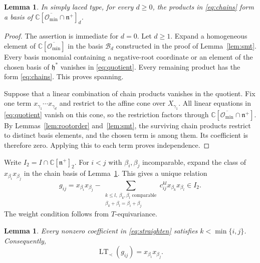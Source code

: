 \documentclass[12pt]{article}
\newtheorem{lemma}[theorem]{Lemma}
\theoremstyle{definition}
\DeclareMathOperator{\LT}{LT}
\newcommand{\C}{\mathbb C}
\newcommand{\h}{\mathfrak h}
\newcommand{\n}{\mathfrak n^{+}}
\newcommand{\oc}{\overline{\mathcal O_{\min}}}
\begin{document}
\begin{lemma}\label{lem:basis}
    In simply laced type, for every $d\geq0$, the products in \eqref{eq:chains} form a basis of $\C[\oc\cap\n]_d$.
\end{lemma}

\begin{proof}
    The assertion is immediate for $d=0$. Let $d\geq1$. Expand a homogeneous element of $\C[\oc]$ in the basis $\mathcal B_d$ constructed in the proof of Lemma~\ref{lem:smt}. Every basis monomial containing a negative-root coordinate or an element of the chosen basis of $\h^*$ vanishes in \eqref{eq:quotient}. Every remaining product has the form \eqref{eq:chains}. This proves spanning.

    Suppose that a linear combination of chain products vanishes in the quotient. Fix one term $x_{\gamma_1}\cdots x_{\gamma_d}$ and restrict to the affine cone over $X_{\gamma_1}$. All linear equations in \eqref{eq:quotient} vanish on this cone, so the restriction factors through $\C[\oc\cap\n]$. By Lemmas~\ref{lem:rootorder} and~\ref{lem:smt}, the surviving chain products restrict to distinct basis elements, and the chosen term is among them. Its coefficient is therefore zero. Applying this to each term proves independence.
\end{proof}

Write $I_2=I\cap\C[\n]_2$. For $i<j$ with $\beta_i,\beta_j$ incomparable, expand the class of $x_{\beta_i}x_{\beta_j}$ in the chain basis of Lemma~\ref{lem:basis}. This gives a unique relation
\begin{equation}\label{eq:straighten}
    g_{ij}=x_{\beta_i} x_{\beta_j}-
    \sum_{\substack{k\leq l,\ \beta_k,\beta_l\text{ comparable}\\
    \beta_k+\beta_l=\beta_i+\beta_j}}c_{ij}^{kl}x_{\beta_k}x_{\beta_l}\in I_2.
\end{equation}
The weight condition follows from $T$-equivariance.

\begin{lemma}\label{lem:leading}
    Every nonzero coefficient in \eqref{eq:straighten} satisfies $k<\min\{i,j\}$. Consequently,
    $$
        \LT_\prec(g_{ij})=x_{\beta_i} x_{\beta_j}.
    $$
\end{lemma}
\end{document}
